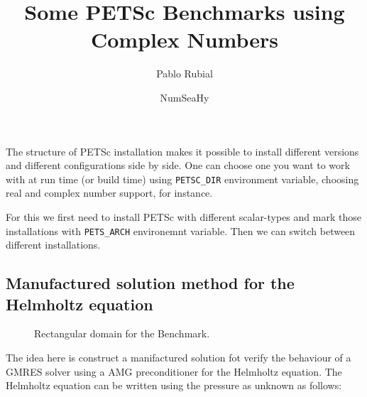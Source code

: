 \documentclass{article}[a4paper, 12pt]
\title{Some PETSc Benchmarks using Complex Numbers}
\author{Pablo Rubial}
\date{NumSeaHy}
\begin{document}
\maketitle

The structure of PETSc installation makes it possible to install different versions and different configurations side by side. One can choose one you want to work with at run time (or build time) using \texttt{PETSC\_DIR} environment variable, choosing real and complex number support, for instance.

For this we first need to install PETSc with different scalar-types and mark those installations with \texttt{PETS\_ARCH} environemnt variable. Then we can switch between different installations.

    
    
    


\subsection*{Manufactured solution method for the Helmholtz equation}

\begin{figure}[h!]
    \centering
    
    \caption{Rectangular domain for the Benchmark.}
    \label{fig:domain}
\end{figure}

The idea here is construct a manifactured solution fot verify the behaviour of a GMRES solver using a AMG preconditioner for the Helmholtz equation. The Helmholtz equation can be written using the pressure as unknown as follows:        
\end{document}
